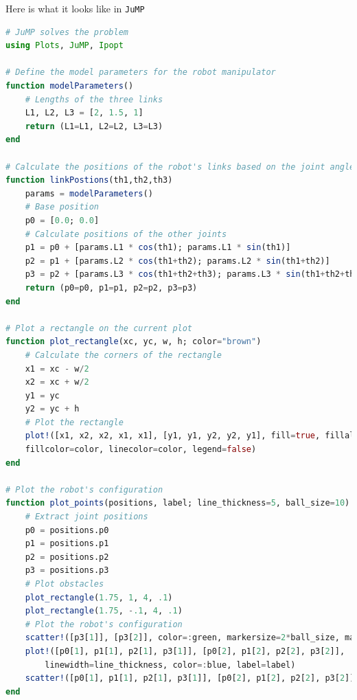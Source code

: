 \bigskip
Here is what it looks like in \texttt{JuMP}
\bigskip

\begin{lstlisting}[language=Julia,style=mystyle]
# JuMP solves the problem 
using Plots, JuMP, Ipopt

# Define the model parameters for the robot manipulator
function modelParameters()
    # Lengths of the three links
    L1, L2, L3 = [2, 1.5, 1]
    return (L1=L1, L2=L2, L3=L3)
end

# Calculate the positions of the robot's links based on the joint angles
function linkPostions(th1,th2,th3)
    params = modelParameters()
    # Base position
    p0 = [0.0; 0.0]
    # Calculate positions of the other joints
    p1 = p0 + [params.L1 * cos(th1); params.L1 * sin(th1)]
    p2 = p1 + [params.L2 * cos(th1+th2); params.L2 * sin(th1+th2)]
    p3 = p2 + [params.L3 * cos(th1+th2+th3); params.L3 * sin(th1+th2+th3)]
    return (p0=p0, p1=p1, p2=p2, p3=p3)
end

# Plot a rectangle on the current plot
function plot_rectangle(xc, yc, w, h; color="brown")
    # Calculate the corners of the rectangle
    x1 = xc - w/2
    x2 = xc + w/2
    y1 = yc
    y2 = yc + h
    # Plot the rectangle
    plot!([x1, x2, x2, x1, x1], [y1, y1, y2, y2, y1], fill=true, fillalpha=1.0, 
    fillcolor=color, linecolor=color, legend=false)
end

# Plot the robot's configuration
function plot_points(positions, label; line_thickness=5, ball_size=10)
    # Extract joint positions
    p0 = positions.p0
    p1 = positions.p1
    p2 = positions.p2
    p3 = positions.p3   
    # Plot obstacles
    plot_rectangle(1.75, 1, 4, .1)
    plot_rectangle(1.75, -.1, 4, .1)
    # Plot the robot's configuration
    scatter!([p3[1]], [p3[2]], color=:green, markersize=2*ball_size, marker=:square, label=nothing)  
    plot!([p0[1], p1[1], p2[1], p3[1]], [p0[2], p1[2], p2[2], p3[2]], 
        linewidth=line_thickness, color=:blue, label=label)        
    scatter!([p0[1], p1[1], p2[1], p3[1]], [p0[2], p1[2], p2[2], p3[2]], color=:red, markersize=ball_size, label=nothing)
end


\end{lstlisting}
